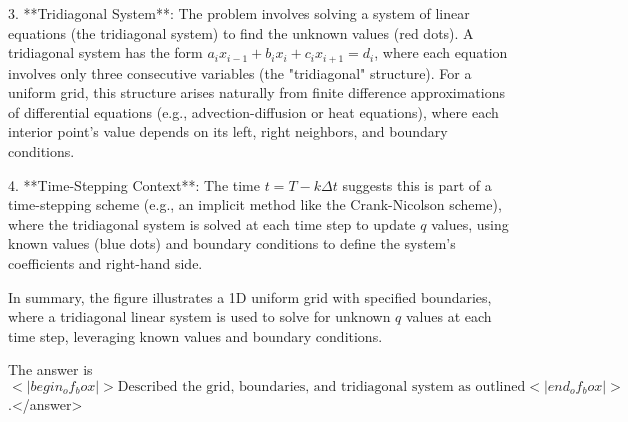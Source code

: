 3. **Tridiagonal System**: The problem involves solving a system of linear equations (the tridiagonal system) to find the unknown values (red dots). A tridiagonal system has the form \( a_i x_{i-1} + b_i x_i + c_i x_{i+1} = d_i \), where each equation involves only three consecutive variables (the "tridiagonal" structure). For a uniform grid, this structure arises naturally from finite difference approximations of differential equations (e.g., advection-diffusion or heat equations), where each interior point’s value depends on its left, right neighbors, and boundary conditions.  

4. **Time-Stepping Context**: The time \( t = T - k\Delta t \) suggests this is part of a time-stepping scheme (e.g., an implicit method like the Crank-Nicolson scheme), where the tridiagonal system is solved at each time step to update \( q \) values, using known values (blue dots) and boundary conditions to define the system’s coefficients and right-hand side.  

In summary, the figure illustrates a 1D uniform grid with specified boundaries, where a tridiagonal linear system is used to solve for unknown \( q \) values at each time step, leveraging known values and boundary conditions.  

The answer is \(<|begin_of_box|>\text{Described the grid, boundaries, and tridiagonal system as outlined}<|end_of_box|>\).</answer>